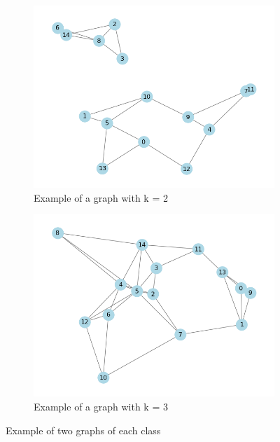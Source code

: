 \documentclass[a4paper,11pt]{article}
\begin{document}
\begin{figure}[h]
    \centering
    \begin{subfigure}{0.4\textwidth}
        \includegraphics[width=\textwidth]{figures/graph_k2.png}
        \caption{Example of a graph with k = 2 }
    \end{subfigure}
    \begin{subfigure}{0.4\textwidth}
        \includegraphics[width=\textwidth]{figures/graph_k3.png}
        \caption{Example of a graph with k = 3}
    \end{subfigure}
    \caption{Example of two graphs of each class}
\end{figure} 
\end{document}
